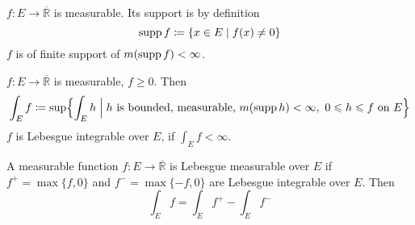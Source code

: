 \begin{definition*}
    $f : E \to \overline{\mathbb{R}}$ is measurable.
    Its support is by definition
    \[ \operatorname{supp} f \coloneqq \{ x \in E \mid f(x) \ne 0 \} \]
    $f$ is of finite support of $m(\operatorname{supp} f) < \infty$.
\end{definition*}
\begin{definition}
    \label{def:definitionThree}
    $f : E \to \overline{\mathbb{R}}$ is measurable, $f \ge 0$. Then
    \[
        \int_E f \coloneqq \sup \Bigl\{
            \int_E h \mathrel{\Big\vert}
            \text{$h$ is bounded, measurable,}\
            m(\operatorname{supp} h) < \infty,\ 0 \leqslant h \leqslant f \text{ on } E
        \Bigr\} 
    \]
    $f$ is Lebesgue integrable over $E$, if $\int_E f < \infty$.
\end{definition}
\begin{definition}
    A measurable function $f : E \to \overline{\mathbb{R}}$
    is Lebesgue measurable over $E$ if 
    $f^+ = \max\{f, 0\}$ and $f^- = \max\{-f, 0\}$ are Lebesgue
    integrable over $E$.
    Then
    \[ \int_E f = \int_E f^+ - \int_E f^- \]
\end{definition}

